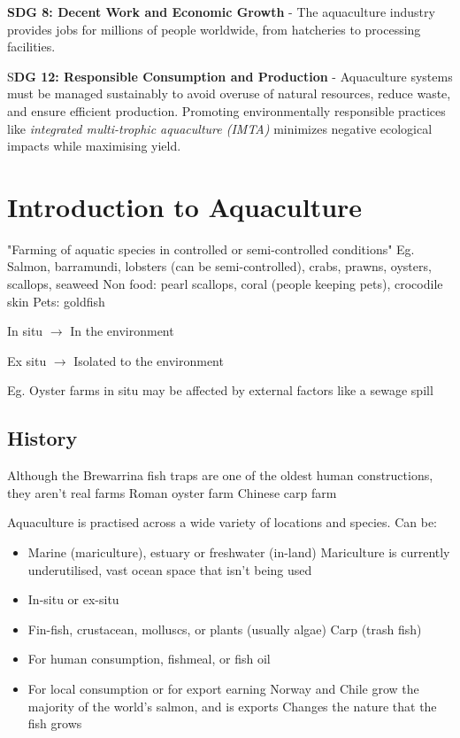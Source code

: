 		\textbf{SDG 8: Decent Work and Economic Growth} - The aquaculture industry provides jobs for millions of people worldwide, from hatcheries to processing facilities.

		S\textbf{DG 12: Responsible Consumption and Production} - Aquaculture systems must be managed sustainably to avoid overuse of natural resources, reduce waste, and ensure efficient production. Promoting environmentally responsible practices like \textit{integrated multi-trophic aquaculture (IMTA)} minimizes negative ecological impacts while maximising yield.

\newpage

\section{Introduction to Aquaculture} \label{1/11/2024}
	"Farming of aquatic species in controlled or semi-controlled conditions"
		Eg. Salmon, barramundi, lobsters (can be semi-controlled), crabs, prawns, oysters, scallops, seaweed
		Non food: pearl scallops, coral (people keeping pets), crocodile skin
		Pets: goldfish

	In situ $\rightarrow$ In the environment

	Ex situ $\rightarrow$ Isolated to the environment

	Eg. Oyster farms in situ may be affected by external factors like a sewage spill

	\subsection{History}
		Although the Brewarrina fish traps are one of the oldest human constructions, they aren't real farms
		Roman oyster farm
		Chinese carp farm

	Aquaculture is practised across a wide variety of locations and species. Can be:
	\begin{itemize}
		\item Marine (mariculture), estuary or freshwater (in-land)
			\subitem Mariculture is currently underutilised, vast ocean space that isn't being used
		\item In-situ or ex-situ
		\item Fin-fish, crustacean, molluscs, or plants (usually algae)
			\subitem Carp (trash fish)
		\item For human consumption, fishmeal, or fish oil
		\item For local consumption or for export earning
			\subitem Norway and Chile grow the majority of the world's salmon, and is exports
			\subitem Changes the nature that the fish grows
	\end{itemize}

